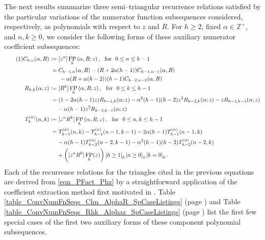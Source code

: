 \documentclass[12pt,reqno]{article}
\numberwithin{sfootnote}{section}
\newcommand{\tableref}[1]{Table \ref{#1} (page \pageref{#1})}
\numberwithin{equation}{section}
\newcommand{\tagonce}[0]{
     \addtocounter{equation}{1}
     \tag{\theequation}
}
\theoremstyle{plain}
\theoremstyle{definition}
\theoremstyle{remark}
\newcommand{\defequals}{\ensuremath{\vcentcolon=}}
\newcommand{\Iverson}[1]{\ensuremath{\left[#1\right]_{\delta}}}
\newcommand{\ConvFP}[4]{\ensuremath{\FP_{#1}\left(#2, #3; #4\right)}}
\DeclareMathOperator{\FP}{FP}
\begin{document}
The next results summarize three semi--triangular 
recurrence relations satisfied by the 
particular variations of the numerator function subsequences considered, 
respectively, as polynomials with respect to $z$ and $R$. 
For $h \geq 2$, fixed $\alpha \in \mathbb{Z}^{+}$, and 
$n, k \geq 0$, we consider the following forms of these auxiliary 
numerator coefficient subsequences: 
\begin{align*} 
\tagonce\label{eqn_Chk_aux_numerator_subseqs-def_v1}
C_{h,n}(\alpha, R) & \defequals [z^n] \ConvFP{h}{\alpha}{R}{z},\ 
       \text{ for \ } 
       0 \leq n \leq h-1 \\ 
       & \phantom{:} = 
C_{h-1,n}(\alpha, R) - (R+2\alpha(h-1)) C_{h-1,n-1}(\alpha, R) \\ 
     & \phantom{= \quad} - 
     \alpha(R+\alpha(h-2))(h-1) C_{h-2,n-2}(\alpha, R) \\ 
R_{h,k}(\alpha; z) & \defequals [R^k] \ConvFP{h}{\alpha}{R}{z},\ 
       \text{ for \ } 
       0 \leq k \leq h-1 \\ 
       & \phantom{:} = 
     (1-2\alpha(h-1)z)R_{h-1,k}(\alpha; z) - 
     \alpha^2(h-1)(h-2)z^2 R_{h-2,k}(\alpha; z) - 
     zR_{h-1,k-1}(\alpha; z) \\ 
       & \phantom{\defequals\ }  
     - \alpha(h-1)z^2 R_{h-2,k-1}(\alpha; z) \\ 
T_h^{(\alpha)}(n, k) & \defequals [z^n R^k] \ConvFP{h}{\alpha}{R}{z},\ 
       \text{ for \ } 
       0 \leq n, k \leq h-1 \\ 
       & \phantom{:}= 
T_{h-1}^{(\alpha)}(n, k) -T_{h-1}^{(\alpha)}(n-1, k-1) - 
     2\alpha (h-1) T_{h-1}^{(\alpha)}(n-1 ,k) \\ 
   & \phantom{\defequals\ } - 
     \alpha (h-1) T_{h-2}^{(\alpha)}(n-2, k-1) - 
     \alpha^2 (h-1)(h-2) T_{h-2}^{(\alpha)}(n-2, k) \\ 
   & \phantom{\defequals\ } + 
     \left([z^n R^0] \FP_h(z)\right) 
     \Iverson{h \geq 1} \Iverson{n \geq 0} \Iverson{k = 0}. 
\end{align*} 
Each of the recurrence relations for the triangles 
cited in the previous equations 
are derived from \eqref{eqn_PFact_Phz} by a 
straightforward application of the coefficient extraction method 
first motivated in \citep{MULTIFACTJIS}. 
\tableref{table_ConvNumFnSeqs_Chn_AlphaR_SpCaseListings} and 
\tableref{table_ConvNumFnSeqs_Rhk_Alphaz_SpCaseListings} 
list the first few special cases of the first two 
auxiliary forms of these component polynomial subsequences. 
\end{document}
